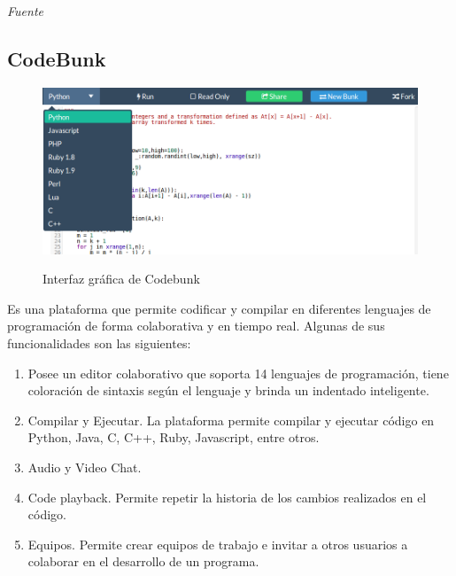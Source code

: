 \emph{Fuente} \cite{pinzas_desarrollo_2013}

\subsection{CodeBunk}
\begin{figure}[h]
  \centering
  \includegraphics[scale=0.3]{figuras/codebunk.png}\\
  \caption[CodeBunk]{Interfaz gráfica de Codebunk \protect\cite{codebunk}}\label{fig:codebunk}
\end{figure}
Es una plataforma que permite codificar y compilar en diferentes lenguajes de programación de forma colaborativa y en tiempo real. Algunas de sus funcionalidades son las siguientes:\\

\begin{enumerate}
  \item Posee un editor colaborativo que soporta 14 lenguajes de programación, tiene coloración de sintaxis según el lenguaje y brinda un indentado inteligente.
  \item Compilar y Ejecutar. La plataforma permite compilar y ejecutar código en Python, Java, C, C++, Ruby, Javascript, entre otros.
  \item Audio y Video Chat.
  \item Code playback. Permite repetir la historia de los cambios realizados en el código.
  \item Equipos. Permite crear equipos de trabajo e invitar a otros usuarios a colaborar en el desarrollo de un programa.
\end{enumerate}


\newpage
